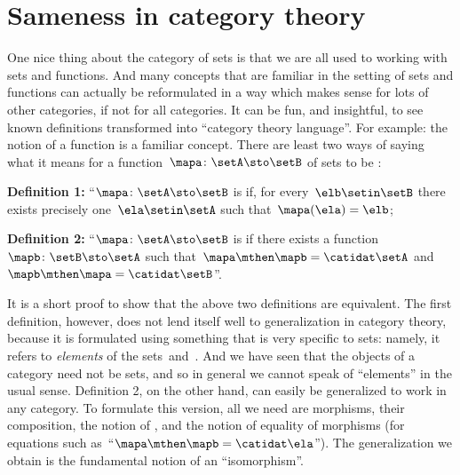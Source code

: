 
\section{Sameness in category theory}
\label{sec:attributes_sameness}

One nice thing about the category of sets is that we are all used to working with sets and functions.
And many concepts that are familiar in the setting of sets and functions can actually be reformulated in a way which makes sense for lots of other categories, if not for all categories.
It can be fun, and insightful, to see known definitions transformed into ``category theory language''.
For example: the notion of a  function is a familiar concept.
There are least two ways of saying what it means for a function~$\mapa \colon \setA \sto \setB$ of sets to be :

\textbf{Definition 1:} ``$\mapa \colon \setA \sto \setB$ is  if, for every~$\elb \setin \setB$ there exists precisely one~$\ela \setin \setA$ such that~$\mapa(\ela) = \elb$;

\textbf{Definition 2:} ``$\mapa \colon \setA \sto \setB$ is  if there exists a function~$\mapb\colon \setB \sto \setA$ such that~$\mapa \mthen \mapb = \catidat\setA$ and~$\mapb \mthen \mapa = \catidat\setB$''.

It is a short proof to show that the above two definitions are equivalent.
The first definition, however, does not lend itself well to generalization in category theory, because it is formulated using something that is very specific to sets: namely, it refers to \emph{elements} of the sets~\setA and~\setB.
And we have seen that the objects of a category need not be sets, and so in general we cannot speak of ``elements'' in the usual sense.
Definition 2, on the other hand, can easily be generalized to work in any category.
To formulate this version, all we need are morphisms, their composition, the notion of , and the notion of equality of morphisms (for equations such as~``$\mapa \mthen \mapb= \catidat\ela$'').
The generalization we obtain is the fundamental notion of an ``isomorphism''.


